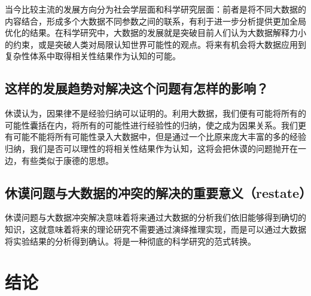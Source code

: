 \documentclass{ctexart}
\begin{document}
当今比较主流的发展方向分为社会学层面和科学研究层面：前者是将不同大数据的内容结合，形成多个大数据不同参数之间的联系，有利于进一步分析提供更加全局优化的结果。在科学研究中，大数据的发展就是突破目前人们认为大数据解释力小的约束，或是突破人类对局限认知世界可能性的观点。将来有机会将大数据应用到复杂性体系中取得相关性结果作为认知的可能。

\subsection{这样的发展趋势对解决这个问题有怎样的影响？}

休谟认为，因果律不是经验归纳可以证明的。利用大数据，我们便有可能将所有的可能性囊括在内，将所有的可能性进行经验性的归纳，使之成为因果关系。我们更有可能不能将所有可能性录入大数据中，但是通过一个比原来庞大丰富的多的经验归纳，我们是否可以理性的将相关性结果作为认知，这将会把休谟的问题抛开在一边，有些类似于康德的思想。

\subsection{休谟问题与大数据的冲突的解决的重要意义（restate）}

休谟问题与大数据冲突解决意味着将来通过大数据的分析我们依旧能够得到确切的知识，这就意味着将来的理论研究不需要通过演绎推理实现，而是可以通过大数据将实验结果的分析得到确认。将是一种彻底的科学研究的范式转换。

\section{结论}

    


    
%
\end{document}
